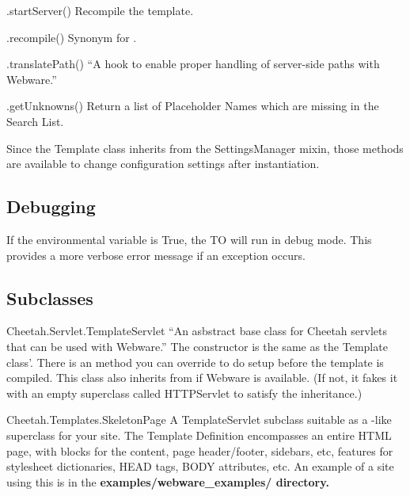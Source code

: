 \begin{description}
\item{.startServer()}  Recompile the template.  

\item{.recompile()}  Synonym for .

\item{.translatePath()}  ``A hook to enable proper handling of server-side
     paths with Webware.''
     
\item{.getUnknowns()}  Return a list of Placeholder Names which are missing in
     the Search List.

\end{description}

Since the Template class inherits from the SettingsManager mixin, those methods
are available to change configuration settings after instantiation.



\subsection{Debugging}

If the environmental variable  is True, the TO will
run in debug mode.  This provides a more verbose error message if an 
exception occurs.


\subsection{Subclasses}

\begin{description}

\item{Cheetah.Servlet.TemplateServlet}  ``An asbstract base class for Cheetah
     servlets that can be used with Webware.''  The constructor is the same
     as the Template class'.  There is an  method
     you can override to do setup before the template is compiled.  This class
     also inherits from  if Webware is
     available.  (If not, it fakes it with an empty superclass called
     HTTPServlet to satisfy the inheritance.)

\item{Cheetah.Templates.SkeletonPage}  A TemplateServlet subclass suitable as
     a -like superclass for your site.  The Template 
     Definition encompasses an entire HTML page, with blocks for the content,
     page header/footer, sidebars, etc, features for stylesheet dictionaries,
     HEAD tags, BODY attributes, etc.  An example of a site using this is in
     the \bf{examples/webware\_examples/} directory.

\end{description}
